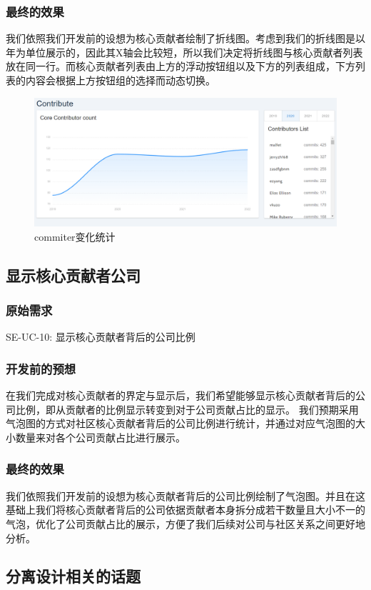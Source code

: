 \documentclass[a4paper,20pt]{article}
\begin{document}
\subsubsection{最终的效果}
我们依照我们开发前的设想为核心贡献者绘制了折线图。考虑到我们的折线图是以年为单位展示的，因此其X轴会比较短，所以我们决定将折线图与核心贡献者列表放在同一行。而核心贡献者列表由上方的浮动按钮组以及下方的列表组成，下方列表的内容会根据上方按钮组的选择而动态切换。
\begin{figure}[h]
\centering
\includegraphics[scale=0.2]{pics/contributor.png}
\caption{commiter变化统计}
\label{fig:1}
\end{figure}

\subsection{显示核心贡献者公司}
\subsubsection{原始需求}
SE-UC-10: 显示核⼼贡献者背后的公司⽐例\par
\subsubsection{开发前的预想}
在我们完成对核心贡献者的界定与显示后，我们希望能够显示核心贡献者背后的公司比例，即从贡献者的比例显示转变到对于公司贡献占比的显示。
我们预期采用气泡图的方式对社区核⼼贡献者背后的公司⽐例进行统计，并通过对应气泡图的大小数量来对各个公司贡献占比进行展示。
\subsubsection{最终的效果}
我们依照我们开发前的设想为核心贡献者背后的公司比例绘制了气泡图。并且在这基础上我们将核心贡献者背后的公司依据贡献者本身拆分成若干数量且大小不一的气泡，优化了公司贡献占比的展示，方便了我们后续对公司与社区关系之间更好地分析。
\subsection{分离设计相关的话题}
\end{document}
